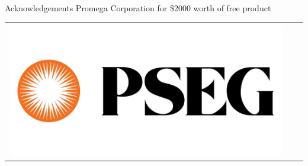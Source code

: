 \documentclass[final]{beamer}
\newlength{\onecolwid}
\begin{document}
\begin{frame}[t]
\begin{columns}[t]
\begin{column}{\onecolwid}
\begin{block}{Acknowledgements}
{{Promega Corporation for \$2000 worth of free product
}} 

\end{block}



\begin{center}
\begin{tabular}{ccc}
\includegraphics[width=0.8\linewidth]{pseg_logo.jpg}
\end{tabular}
\end{center}

\end{column} %

\end{columns} %

\end{frame} %
\end{document}
